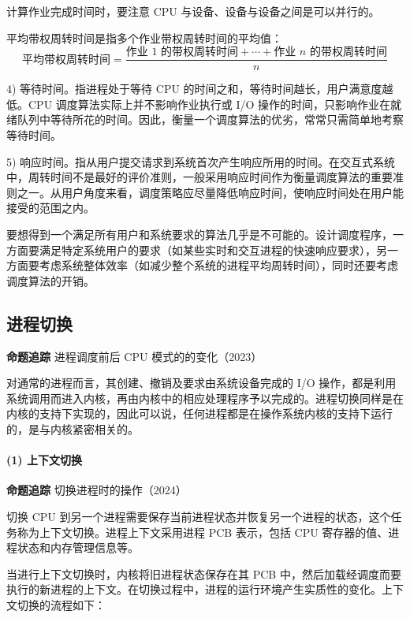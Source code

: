 \documentclass{ctexbook}
\begin{document}
	\begin{tcolorbox}[colback=gray!10, colframe=black!50, title=注意]
		计算作业完成时间时，要注意 CPU 与设备、设备与设备之间是可以并行的。
	\end{tcolorbox}
	
	平均带权周转时间是指多个作业带权周转时间的平均值：
	\[
	\text{平均带权周转时间} = \frac{\text{作业 1 的带权周转时间} + \cdots + \text{作业 } n \text{ 的带权周转时间}}{n}
	\]
	
	4) 等待时间。指进程处于等待 CPU 的时间之和，等待时间越长，用户满意度越低。CPU 调度算法实际上并不影响作业执行或 I/O 操作的时间，只影响作业在就绪队列中等待所花的时间。因此，衡量一个调度算法的优劣，常常只需简单地考察等待时间。
	
	5) 响应时间。指从用户提交请求到系统首次产生响应所用的时间。在交互式系统中，周转时间不是最好的评价准则，一般采用响应时间作为衡量调度算法的重要准则之一。从用户角度来看，调度策略应尽量降低响应时间，使响应时间处在用户能接受的范围之内。
	
	要想得到一个满足所有用户和系统要求的算法几乎是不可能的。设计调度程序，一方面要满足特定系统用户的要求（如某些实时和交互进程的快速响应要求），另一方面要考虑系统整体效率（如减少整个系统的进程平均周转时间），同时还要考虑调度算法的开销。
	
	\subsection{进程切换}
	
	\textbf{命题追踪} 进程调度前后 CPU 模式的的变化（2023）
	
	对通常的进程而言，其创建、撤销及要求由系统设备完成的 I/O 操作，都是利用系统调用而进入内核，再由内核中的相应处理程序予以完成的。进程切换同样是在内核的支持下实现的，因此可以说，任何进程都是在操作系统内核的支持下运行的，是与内核紧密相关的。
	
	\paragraph{(1) 上下文切换}
	
	\textbf{命题追踪} 切换进程时的操作（2024）
	
	切换 CPU 到另一个进程需要保存当前进程状态并恢复另一个进程的状态，这个任务称为上下文切换。进程上下文采用进程 PCB 表示，包括 CPU 寄存器的值、进程状态和内存管理信息等。
	
	当进行上下文切换时，内核将旧进程状态保存在其 PCB 中，然后加载经调度而要执行的新进程的上下文。在切换过程中，进程的运行环境产生实质性的变化。上下文切换的流程如下：
	
\end{document}
